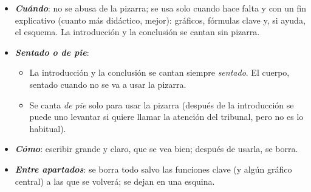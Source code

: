 \documentclass[11pt]{article}
\begin{document}
\begin{itemize}
\item \textbf{\emph{Cuándo}}: no se abusa de la pizarra; se usa solo cuando hace falta y con un fin explicativo (cuanto más didáctico, mejor): gráficos, fórmulas clave y, si ayuda, el esquema. La introducción y la conclusión se cantan sin pizarra.
\item \textbf{\emph{Sentado o de pie}}:
  \begin{itemize}
  \item La introducción y la conclusión se cantan siempre \emph{sentado}. El cuerpo, sentado cuando no se va a usar la pizarra.
  \item Se canta \emph{de pie} solo para usar la pizarra (después de la introducción se puede uno levantar si quiere llamar la atención del tribunal, pero no es lo habitual).
  \end{itemize}
\item \textbf{\emph{Cómo}}: escribir grande y claro, que se vea bien; después de usarla, se borra.
\item \textbf{\emph{Entre apartados}}: se borra todo salvo las funciones clave (y algún gráfico central) a las que se volverá; se dejan en una esquina.
\end{itemize}
\end{document}
